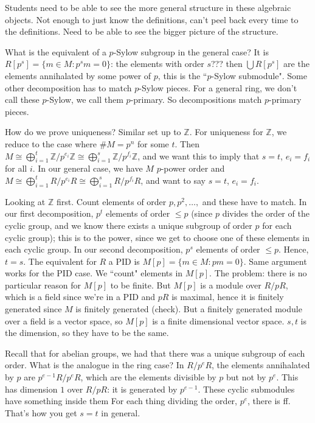 \documentclass{article}
\theoremstyle{plain}
\theoremstyle{remark}
\newcommand{\Z}{{\mathbb Z}}
\begin{document}
Students need to be able to see the more general structure in these algebraic objects.
Not enough to just know the definitions, can't peel back every time to the definitions.
Need to be able to see the bigger picture of the structure.

What is the equivalent of a $p$-Sylow subgroup in the general case?
It is $R[p^s] = \{m \in M \colon p^s m = 0\}$:
the elements with order $s$???
then $\bigcup R[p^s]$ are the elements annihalated by some power of $p$,
this is the ``$p$-Sylow submodule".
Some other decomposition has to match $p$-Sylow pieces.
For a general ring, we don't call these $p$-Sylow, we call them $p$-primary.
So decompositions match $p$-primary pieces.

How do we prove uniqueness? Similar set up to $\Z$.
For uniqueness for $\Z$, we reduce to the case where $\# M = p^n$ for some $t$.
Then $M \cong \bigoplus_{i=1}^t \Z/p^{e_i}\Z \cong \bigoplus_{i=1}^s \Z/p^{f_i}\Z$,
and we want this to imply that $s = t$, $e_i = f_i$ for all $i$.
In our general case, we have $M$ $p$-power order and
$M \cong \bigoplus_{i=1}^t R/p^{e_i}R \cong \bigoplus_{i=1}^s R/p^{f_i}R$,
and want to say $s = t$, $e_i = f_i$.

Looking at $\Z$ first.
Count elements of order $p,p^2,\dots,$ and these have to match.
In our first decomposition, $p^t$ elements of order $\leq p$
(since $p$ divides the order of the cyclic group,
and we know there exists a unique subgroup of order $p$ for each cyclic group);
this is to the power, since we get to choose one of these elements in each cyclic group.
In our second decomposition, $p^s$ elements of order $\leq p$.
Hence, $t = s$.
The equivalent for $R$ a PID is $M[p] = \{m \in M \colon pm = 0\}$.
Same argument works for the PID case.
We ``count" elements in $M[p]$.
The problem: there is no particular reason for $M[p]$ to be finite.
But $M[p]$ is a module over $R/pR$, which is a field
since we're in a PID and $pR$ is maximal,
hence it is finitely generated since $M$ is finitely generated (check).
But a finitely generated module over a field is a vector space,
so $M[p]$ is a finite dimensional vector space.
$s,t$ is the dimension, so they have to be the same.

Recall that for abelian groups, we had that there was a unique subgroup of each order.
What is the analogue in the ring case?
In $R/p^eR$, the elements annihalated by $p$ are $p^{e-1}R/p^eR$,
which are the elements divisible by $p$ but not by $p^e$.
This has dimension $1$ over $R/pR$: it is generated by $p^{e-1}$.
These cyclic submodules have something inside them 
For each thing dividing the order, $p^e$, there is ff.
That's how you get $s = t$ in general.
\end{document}
